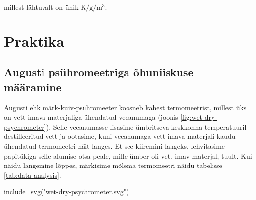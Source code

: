 \documentclass[
  12pt,
  a4paper,
  onecolumn, twoside]{article}
\newenvironment{Shaded}{\begin{snugshade}}{\end{snugshade}}
\newcommand{\FunctionTok}[1]{\textcolor[rgb]{0.00,0.00,0.00}{#1}}
\newcommand{\NormalTok}[1]{#1}
\newcommand{\StringTok}[1]{\textcolor[rgb]{0.31,0.60,0.02}{#1}}
\begin{document}
millest lähtuvalt on ühik \(\unit{\kelvin\per\gram\per\cubic\meter}\).

\hypertarget{praktika}{%
\section{Praktika}\label{praktika}}

\hypertarget{augusti-psuxfchromeetriga-uxf5huniiskuse-muxe4uxe4ramine}{%
\subsection{Augusti psühromeetriga õhuniiskuse määramine}\label{augusti-psuxfchromeetriga-uxf5huniiskuse-muxe4uxe4ramine}}

Augusti ehk märk-kuiv-psühromeeter koosneb kahest termomeetrist, millest üks on vett imava materjaliga ühendatud veeanumaga (joonis \ref{fig:wet-dry-psychrometer}). Selle veeanumasse lisasime ümbritseva keskkonna temperatuuril destilleeritud vett ja ootasime, kuni veeanumaga vett imava materjali kaudu ühendatud termomeetri näit langes. Et see kiiremini langeks, lehvitasime papitükiga selle alumise otsa peale, mille ümber oli vett imav materjal, tuult. Kui näidu langemine lõppes, märkisime mõlema termomeetri näidu tabelisse \ref{tab:data-analysis}.



\begin{Shaded}
\begin{Highlighting}[numbers=left,,]
\FunctionTok{include\_svg}\NormalTok{(}\StringTok{"wet{-}dry{-}psychrometer.svg"}\NormalTok{)}
\end{Highlighting}
\end{Shaded}
\end{document}

